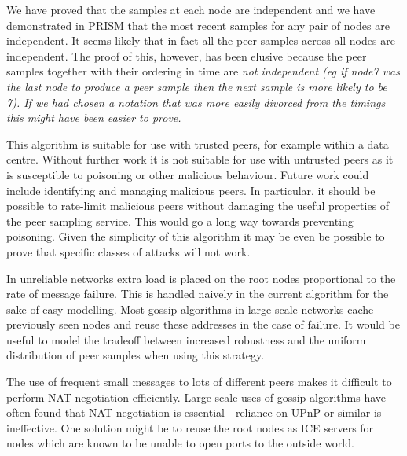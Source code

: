 \documentclass[a4paper,10pt]{article}
\begin{document}
We have proved that the samples at each node are independent and we have demonstrated in PRISM that the most recent samples for any pair of nodes are independent. It seems likely that in fact all the peer samples across all nodes are independent. The proof of this, however, has been elusive because the peer samples together with their ordering in time are \em not \em independent (eg if node7 was the last node to produce a peer sample then the next sample is more likely to be 7). If we had chosen a notation that was more easily divorced from the timings this might have been easier to prove.

This algorithm is suitable for use with trusted peers, for example within a data centre. Without further work it is not suitable for use with untrusted peers as it is susceptible to poisoning or other malicious behaviour. Future work could include identifying and managing malicious peers. In particular, it should be possible to rate-limit malicious peers without damaging the useful properties of the peer sampling service. This would go a long way towards preventing poisoning. Given the simplicity of this algorithm it may be even be possible to prove that specific classes of attacks will not work.

In unreliable networks extra load is placed on the root nodes proportional to the rate of message failure. This is handled naively in the current algorithm for the sake of easy modelling. Most gossip algorithms in large scale networks cache previously seen nodes and reuse these addresses in the case of failure. It would be useful to model the tradeoff between increased robustness and the uniform distribution of peer samples when using this strategy.

The use of frequent small messages to lots of different peers makes it difficult to perform NAT negotiation efficiently. Large scale uses of gossip algorithms have often found that NAT negotiation is essential \cite{arrg, tribler} - reliance on UPnP or similar is ineffective. One solution might be to reuse the root nodes as ICE servers for nodes which are known to be unable to open ports to the outside world.
\end{document}
